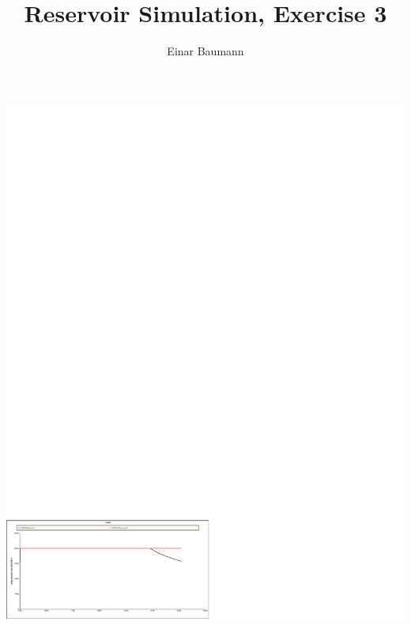 



\title{Reservoir Simulation, Exercise 3}
\author{Einar Baumann}
\maketitle
\thispagestyle{empty}




\pagebreak
\centerline{\includegraphics[clip=true, trim=0cm 0cm 10.6cm 22.6cm,width=1.3\textwidth]{graphics/fopr_comb.pdf}}
